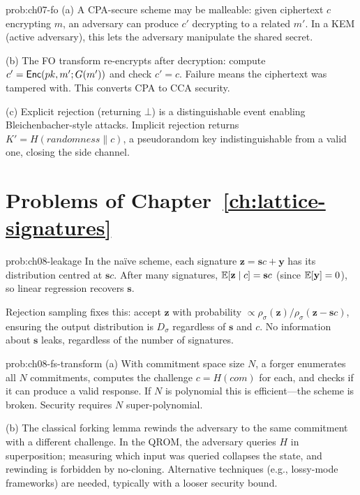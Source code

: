\begin{sol}{prob:ch07-fo}
(a) A CPA-secure scheme may be malleable: given ciphertext $c$ encrypting $m$, an adversary can produce $c'$ decrypting to a related $m'$.  In a KEM (active adversary), this lets the adversary manipulate the shared secret.

(b) The FO transform re-encrypts after decryption: compute $c'=\mathsf{Enc}(pk,m';G(m'))$ and check $c'=c$.  Failure means the ciphertext was tampered with.  This converts CPA to CCA security.

(c) Explicit rejection (returning $\bot$) is a distinguishable event enabling Bleichenbacher-style attacks.  Implicit rejection returns $K'=H(\mathit{randomness}\|c)$, a pseudorandom key indistinguishable from a valid one, closing the side channel.
\end{sol}

\section*{Problems of Chapter~\ref{ch:lattice-signatures}}

\begin{sol}{prob:ch08-leakage}
In the na\"ive scheme, each signature $\mathbf{z}=\mathbf{s}c+\mathbf{y}$ has its distribution centred at $\mathbf{s}c$.  After many signatures, $\operatorname{\mathbb{E}}[\mathbf{z}\mid c]=\mathbf{s}c$ (since $\operatorname{\mathbb{E}}[\mathbf{y}]=0$), so linear regression recovers $\mathbf{s}$.

Rejection sampling fixes this: accept $\mathbf{z}$ with probability $\propto\rho_\sigma(\mathbf{z})/\rho_\sigma(\mathbf{z}-\mathbf{s}c)$, ensuring the output distribution is $D_\sigma$ regardless of $\mathbf{s}$ and $c$.  No information about $\mathbf{s}$ leaks, regardless of the number of signatures.
\end{sol}

\begin{sol}{prob:ch08-fs-transform}
(a) With commitment space size $N$, a forger enumerates all $N$ commitments, computes the challenge $c=H(\mathit{com})$ for each, and checks if it can produce a valid response.  If $N$ is polynomial this is efficient---the scheme is broken.  Security requires $N$ super-polynomial.

(b) The classical forking lemma rewinds the adversary to the same commitment with a different challenge.  In the QROM, the adversary queries $H$ in superposition; measuring which input was queried collapses the state, and rewinding is forbidden by no-cloning.  Alternative techniques (e.g., lossy-mode frameworks) are needed, typically with a looser security bound.
\end{sol}

